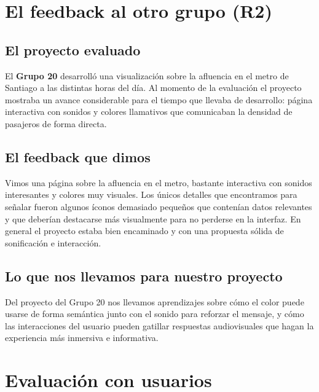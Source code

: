 \documentclass{article}
\begin{document}
\section{El feedback al otro grupo (R2)}

\subsection{El proyecto evaluado}

El \textbf{Grupo 20} desarroll\'{o} una visualizaci\'{o}n sobre la afluencia en el metro de
Santiago a las distintas horas del d\'{i}a.
Al momento de la evaluaci\'{o}n el proyecto mostraba un avance considerable para el tiempo que
llevaba de desarrollo: p\'{a}gina interactiva con sonidos y colores llamativos que comunicaban
la densidad de pasajeros de forma directa.

\subsection{El feedback que dimos}

Vimos una p\'{a}gina sobre la afluencia en el metro, bastante interactiva con sonidos
interesantes y colores muy visuales.
Los \'{u}nicos detalles que encontramos para se\~{n}alar fueron algunos \'{i}conos demasiado
peque\~{n}os que conten\'{i}an datos relevantes y que deber\'{i}an destacarse m\'{a}s
visualmente para no perderse en la interfaz.
En general el proyecto estaba bien encaminado y con una propuesta s\'{o}lida de sonificaci\'{o}n
e interacci\'{o}n.

\subsection{Lo que nos llevamos para nuestro proyecto}

Del proyecto del Grupo 20 nos llevamos aprendizajes sobre c\'{o}mo el color puede usarse de
forma sem\'{a}ntica junto con el sonido para reforzar el mensaje, y c\'{o}mo las interacciones
del usuario pueden gatillar respuestas audiovisuales que hagan la experiencia m\'{a}s inmersiva
e informativa.

\section{Evaluaci\'{o}n con usuarios}
\end{document}
